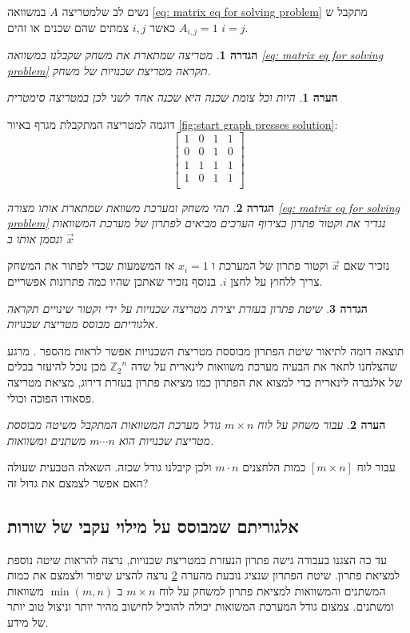 \documentclass[12pt,leqno]{article}
\theoremstyle{theoremdd}
\newtheorem{definition}{הגדרה}[section]
\newtheorem{comm}{הערה}[section]
\newcommand{\Zn}{{\mathbb{Z}_2}^n}
\begin{document}
נשים לב שלמטריצה
$A$
במשוואה
\ref{eq: matrix eq for solving problem}
מתקבל ש
$A_{i,j} = 1$
כאשר 
$i, j$
צמתים שהם שכנים או זהים
$i = j$.
\begin{definition}
    \label{def: neighbor matrix}
    מטריצה שמתארת את משחק 
    שקבלנו במשוואה
    \ref{eq: matrix eq for solving problem}
    תקראה מטריצת שכנויות של משחק.
\end{definition}
\begin{comm}
    \label{comm: symetic matrix}
    היות וכל צומת שכנה היא שכנה אחד לשני לכן במטריצה
    סימטרית
\end{comm}
דוגמה למטריצה  המתקבלת מגרף באיור 
\ref{fig:start graph presses solution}:
\[
    \begin{bmatrix}
        1 & 0 & 1 & 1\\
        0 & 0 & 1 & 0\\
        1 & 1 & 1 & 1\\
        1 & 0 & 1 & 1\\
    \end{bmatrix}
\]
\begin{definition}
    \label{ def: solution vector}
    תהי משחק ומערכת משוואת שמתארת אותו מצורה 
    \ref{eq: matrix eq for solving problem} 
    נגדיר את וקטור פתרון כצירוף הערכים מביאים לפתרון
    של מערכת המשוואות
    ונסמן אותו ב
    $\vec{x}$
\end{definition}
נזכיר שאם
$\vec{x}$
וקטור פתרון של המערכת 
ו
$x_i = 1$
אז המשמעות שכדי לפתור את המשחק
צריך ללחוץ על לחצן 
$i$.
בנוסף 
נזכיר שאתכן שהיו כמה פתרונות אפשריים.
\begin{definition}
    \label{def: standard solution}
    שיטת פתרון בעזרת יצירת  מטריצה שכנויות על ידי וקטור שינויים תקראה
    אלגוריתם מבוסס מטריצת שכנויות.
\end{definition}
תוצאה דומה
לתיאור שיטת הפתרון מבוססת מטריצת השכנויות 
אפשר לראות מהספר
\cite{B2}.
מרגע שהצלחנו לתאר את הבעיה מערכת משוואות לינארית
על שדה
$\Zn$
מכן נוכל להיעזר בכלים של אלגברה לינארית כדי למצוא את הפתרון כמו מציאת פתרון בעזרת דירוג,
מציאת מטריצה פסאודו הפוכה וכולי. 
\begin{comm}
    \label{comm: for board too many variables}
    עבור משחק על לוח 
    $m \times n$
    גודל מערכת המשוואות המתקבל משיטה 
    מבוססת מטריצת שכנויות 
    הוא 
    $m \cdots n$
    משתנים ומשוואות.
\end{comm}
עבור לוח 
$[m \times n]$
כמות הלחצנים 
$m \cdot n$
ולכן 
קיבלנו גודל שכזה.
השאלה הטבעית שעולה האם אפשר לצמצם את גדול זה?

\subsection{אלגוריתם שמבוסס על מילוי עקבי של שורות}
עד כה
הצגנו
בעבודה
גישה פתרון
הנעזרת במטריצת שכנויות,
נרצה להראות שיטה נוספת למציאת פתרון.
שיטת הפתרון שנציג נובעת מהערה 
\ref{comm: for board too many variables}
נרצה להציע שיפור ולצמצם את כמות המשתנים והמשוואות 
למציאת פתרון למשחק על לוח 
$ m \times n$
ב
$\min(m,n)$
משוואות ומשתנים.
צמצום גודל המערכת המשואות יכולה להוביל לחישוב מהיר יותר וניצול טוב יותר של מידע.
\end{document}
